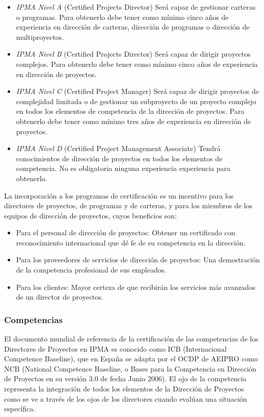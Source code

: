 \begin{itemize}
	\item \emph{IPMA Nivel A} (Certified Projects Director) Será capaz de gestionar carteras o programas. Para obtenerlo debe tener como mínimo cinco años de experiencia en dirección de carteras, dirección de programas o dirección de multiproyectos.
	\item \emph{IPMA Nivel B} (Certified Projects Director) Será capaz de dirigir proyectos complejos. Para obtenerlo debe tener como mínimo cinco años de experiencia en dirección de proyectos.
	\item \emph{IPMA Nivel C} (Certified Project Manager) Será capaz de dirigir proyectos de complejidad limitada o de gestionar un subproyecto de un proyecto complejo en todos los elementos de competencia de la dirección de proyectos. Para obtenerlo debe tener como mínimo tres años de experiencia en dirección de proyectos.
	\item \emph{IPMA Nivel D} (Certified Project Management Associate) Tendrá conocimientos de dirección de proyectos en todos los elementos de competencia. No es obligatoria ninguna experiencia experiencia para obtenerlo.
\end{itemize}

La incorporación a los programas de certificación es un incentivo para los directores de proyectos, de programas y de carteras, y para los miembros de los equipos de dirección de proyectos, cuyos beneficios son:

\begin{itemize}
	\item Para el personal de dirección de proyectos: Obtener un certificado con reconocimiento internacional que dé fe de su competencia en la dirección.
	\item Para los proveedores de servicios de dirección de proyectos: Una demostración de la competencia profesional de sus empleados.
	\item Para los clientes: Mayor certeza de que recibirán los servicios más avanzados de un director de proyectos.
\end{itemize}

\subsubsection{Competencias}

El documento mundial de referencia de la certificación de las competencias de los Directores de Proyectos en IPMA es conocido como ICB (Internacional Competence Baseline), que en España se adapta por el OCDP de AEIPRO como NCB (National Competence Baseline, o Bases para la Competencia en Dirección de Proyectos en su versión 3.0 de fecha Junio 2006). El ojo de la competencia representa la integración de todos los elementos de la Dirección de Proyectos como se ve a través de los ojos de los directores cuando evalúan una situación específica.\\

